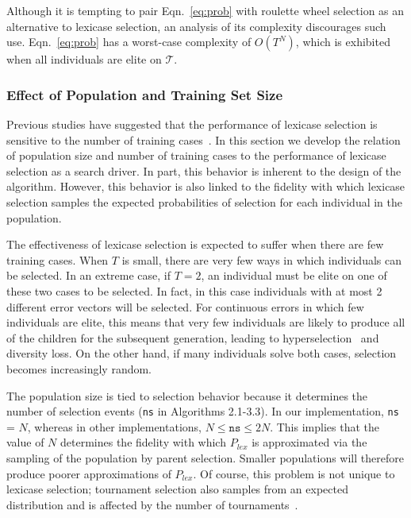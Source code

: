 \documentclass[twoside]{article}
\begin{document}
Although it is tempting to pair Eqn.~\ref{eq:prob} with roulette wheel selection as an alternative to lexicase selection, an analysis of its complexity discourages such use. Eqn.~\ref{eq:prob} has a worst-case complexity of $O(T^N)$, which is exhibited when all individuals are elite on $\mathcal{T}$. 

 
\subsubsection{Effect of Population and Training Set Size}

Previous studies have suggested that the performance of lexicase selection is sensitive to the number of training cases~\citep{liskowski_comparison_2015}. In this section we develop the relation of population size and number of training cases to the performance of lexicase selection as a search driver. In part, this behavior is inherent to the design of the algorithm. However, this behavior is also linked to the fidelity with which lexicase selection samples the expected probabilities of selection for each individual in the population. 

The effectiveness of lexicase selection is expected to suffer when there are few training cases. When $T$ is small, there are very few ways in which individuals can be selected. In an extreme case, if $T = 2$, an individual must be elite on one of these two cases to be selected. In fact, in this case individuals with at most 2 different error vectors will be selected. For continuous errors in which few individuals are elite, this means that very few individuals are likely to produce all of the children for the subsequent generation, leading to hyperselection~\citep{helmuth_impact_2016} and diversity loss. On the other hand, if many individuals solve both cases, selection becomes increasingly random. 

The population size is tied to selection behavior because it determines the number of selection events (\texttt{ns} in Algorithms 2.1-3.3). In our implementation, \texttt{ns} = $N$, whereas in other implementations, $N \leq \texttt{ns} \leq 2N$. This implies that the value of $N$ determines the fidelity with which $P_{lex}$ is approximated via the sampling of the population by parent selection. Smaller populations will therefore produce poorer approximations of $P_{lex}$. Of course, this problem is not unique to lexicase selection; tournament selection also samples from an expected distribution and is affected by the number of tournaments~\citep{xie_another_2007}.  
\end{document}
